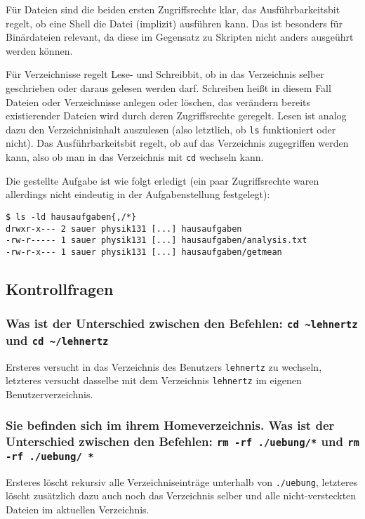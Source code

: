 Für Dateien sind die beiden ersten Zugriffsrechte klar, das Ausführbarkeitsbit
regelt, ob eine Shell die Datei (implizit) ausführen kann. Das ist besonders für
Binärdateien relevant, da diese im Gegensatz zu Skripten nicht anders ausgeührt
werden können.

Für Verzeichnisse regelt Lese- und Schreibbit, ob in das Verzeichnis selber
geschrieben oder daraus gelesen werden darf. Schreiben heißt in diesem Fall
Dateien oder Verzeichnisse anlegen oder löschen, das verändern bereits
existierender Dateien wird durch deren Zugriffsrechte geregelt. Lesen ist analog
dazu den Verzeichnisinhalt auszulesen (also letztlich, ob \lstinline'ls'
funktioniert oder nicht). Das Ausführbarkeitsbit regelt, ob auf das Verzeichnis
zugegriffen werden kann, also ob man in das Verzeichnis mit \lstinline'cd'
wechseln kann.

Die gestellte Aufgabe ist wie folgt erledigt (ein paar Zugriffsrechte waren
allerdings nicht eindeutig in der Aufgabenstellung festgelegt):
\begin{lstlisting}
$ ls -ld hausaufgaben{,/*}
drwxr-x--- 2 sauer physik131 [...] hausaufgaben
-rw-r----- 1 sauer physik131 [...] hausaufgaben/analysis.txt
-rw-r-x--- 1 sauer physik131 [...] hausaufgaben/getmean
\end{lstlisting}

\subsection{Kontrollfragen}

\subsubsection*{Was ist der Unterschied zwischen den Befehlen: \lstinline'cd
~lehnertz' und \lstinline'cd ~/lehnertz'}
Ersteres versucht in das Verzeichnis des Benutzers \verb'lehnertz' zu wechseln,
letzteres versucht dasselbe mit dem Verzeichnis \verb'lehnertz' im eigenen
Benutzerverzeichnis.

\subsubsection*{Sie befinden sich im ihrem Homeverzeichnis. Was ist der
Unterschied zwischen den Befehlen: \lstinline'rm -rf ./uebung/*' und
\lstinline'rm -rf ./uebung/ *'}
Ersteres löscht rekursiv alle Verzeichniseinträge unterhalb von \verb'./uebung',
letzteres löscht zusätzlich dazu auch noch das Verzeichnis selber und alle
nicht-versteckten Dateien im aktuellen Verzeichnis.

